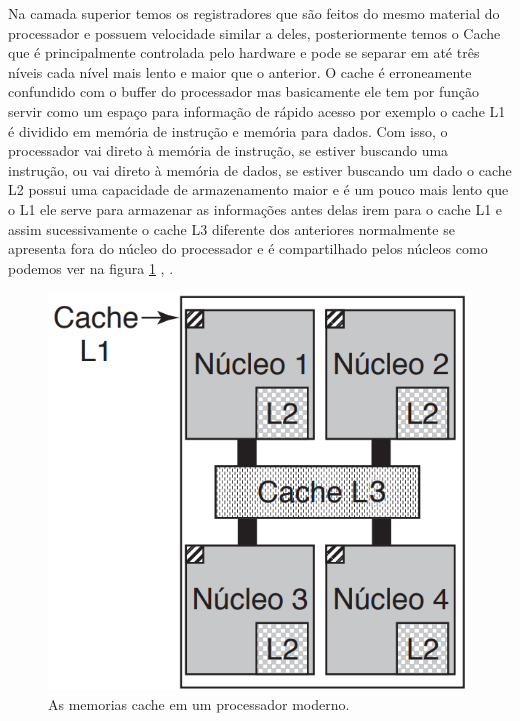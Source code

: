 Na camada superior temos os registradores que são feitos do mesmo material do processador e possuem velocidade similar a deles, posteriormente temos o Cache que é principalmente controlada pelo hardware e pode se separar em até  três níveis cada nível  mais lento e maior que o anterior. O cache é erroneamente confundido com o buffer do processador mas basicamente ele tem por função servir como um espaço para informação de rápido acesso por exemplo  o cache L1 é dividido em memória de instrução e memória para dados. Com isso, o processador vai direto à memória de instrução, se estiver buscando uma instrução, ou vai direto à memória de dados, se estiver buscando um dado o cache L2 possui uma capacidade de armazenamento maior e é um pouco mais lento que o L1 ele serve para armazenar as informações antes delas irem para o cache L1 e assim sucessivamente o cache L3 diferente dos anteriores normalmente se apresenta fora do núcleo do processador e é compartilhado pelos núcleos como podemos ver na figura \ref{fig:cache}  \cite{Tanenbaum2016}, \cite{Comer2012}.\\
\begin{figure}[htpb]
    \centering
   \includegraphics[scale=0.8]{imagens/cache.png}
   \caption{As memorias cache em um processador moderno.}
   \label{fig:cache}
\end{figure}


